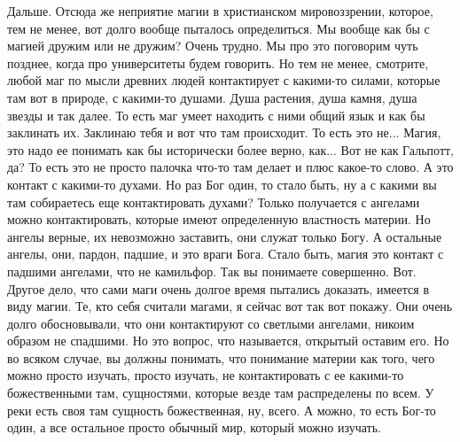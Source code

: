 Дальше. Отсюда же неприятие магии в христианском
мировоззрении, которое, тем не менее, вот долго вообще пыталось определиться. Мы
вообще как бы с магией дружим или не дружим? Очень трудно. Мы про это поговорим
чуть позднее, когда про университеты будем говорить. Но тем не менее, смотрите,
любой маг по мысли древних людей контактирует с какими-то силами, которые там
вот в природе, с какими-то душами. Душа растения, душа камня, душа звезды и так
далее. То есть маг умеет находить с ними общий язык и как бы заклинать их.
Заклинаю тебя и вот что там происходит. То есть это не... Магия, это надо ее
понимать как бы исторически более верно, как... Вот не как Гальпотт, да? То есть
это не просто палочка что-то там делает и плюс какое-то слово. А это контакт с
какими-то духами. Но раз Бог один, то стало быть, ну а с какими вы там
собираетесь еще контактировать духами? Только получается с ангелами можно
контактировать, которые имеют определенную властность материи. Но ангелы верные,
их невозможно заставить, они служат только Богу. А остальные ангелы, они,
пардон, падшие, и это враги Бога. Стало быть, магия это контакт с падшими
ангелами, что не камильфор. Так вы понимаете совершенно. Вот. Другое дело, что
сами маги очень долгое время пытались доказать, имеется в виду магии. Те, кто
себя считали магами, я сейчас вот так вот покажу. Они очень долго обосновывали,
что они контактируют со светлыми ангелами, никоим образом не спадшими. Но это
вопрос, что называется, открытый оставим его. Но во всяком случае, вы должны
понимать, что понимание материи как того, чего можно просто изучать, просто
изучать, не контактировать с ее какими-то божественными там, сущностями, которые
везде там распределены по всем. У реки есть своя там сущность божественная, ну,
всего. А можно, то есть Бог-то один, а все остальное просто обычный мир, который
можно изучать.

